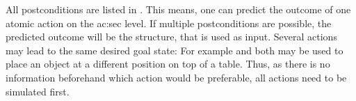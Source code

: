 All postconditions are listed in .
This means, one can predict the outcome of one atomic action on the \gls{ac:sec} level.
If multiple postconditions are possible, the predicted outcome will be the structure, that is used as input.
Several actions may lead to the same desired goal state: For example  and  both may be used to place an object at a different position on top of a table.
Thus, as there is no information beforehand which action would be preferable, all actions need to be simulated first.


